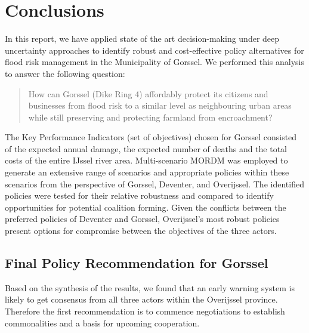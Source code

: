 \section{Conclusions}
\label{s:conc}


In this report, we have applied state of the art decision-making under deep uncertainty approaches to identify robust and cost-effective policy alternatives for flood risk management in the Municipality of Gorssel. We performed this analysis to answer the following question:
\begin{quote}
    How can Gorssel (Dike Ring 4) affordably protect its citizens and businesses from flood risk to a similar level as neighbouring urban areas while still preserving and protecting farmland from encroachment?
\end{quote} 

\noindent The Key Performance Indicators (set of objectives) chosen for Gorssel consisted of the expected annual damage, the expected number of deaths and the total costs of the entire IJssel river area. Multi-scenario MORDM was employed to generate an extensive range of scenarios and appropriate policies within these scenarios from the perspective of Gorssel, Deventer, and Overijssel. The identified policies were tested for their relative robustness and compared to identify opportunities for potential coalition forming. Given the conflicts between the preferred policies of Deventer and Gorssel, Overijssel's most robust policies present options for compromise between the objectives of the three actors.

\subsection{Final Policy Recommendation for Gorssel}
Based on the synthesis of the results, we found that an early warning system is likely to get consensus from all three actors within the Overijssel province. Therefore the first recommendation is to commence negotiations to establish commonalities and a basis for upcoming cooperation.

